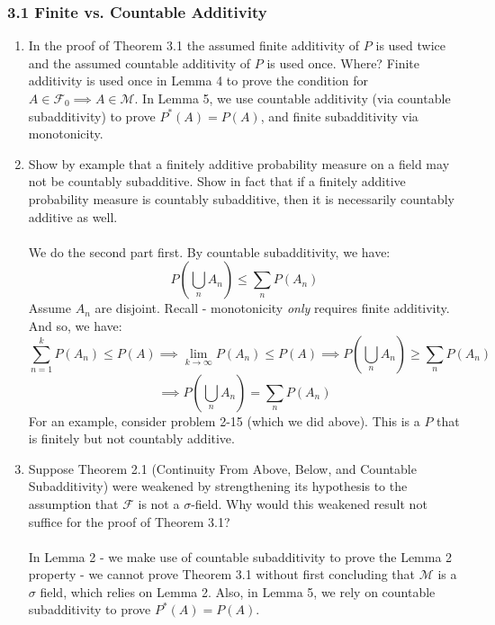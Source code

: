 \documentclass[12pt,a4paper]{article}
\newcommand{\1}[1]{\mathbbm{1}\left\{ #1 \right\}}
\newcommand{\fcal}{\mathcal{F}}
\newcommand{\mcal}{\mathcal{M}}
\begin{document}
\subsubsection{3.1 Finite vs. Countable Additivity}
\begin{enumerate}
	\item In the proof of Theorem 3.1 the assumed finite additivity of $P$ is used twice and the assumed countable additivity of $P$ is used once. Where? Finite additivity is used once in Lemma 4 to prove the condition for $A \in \fcal_0 \implies A \in \mcal$. In Lemma 5, we use countable additivity (via countable subadditivity) to prove $P^*(A) = P(A)$, and finite subadditivity via monotonicity.
	
	\item Show by example that a finitely additive probability measure on a field may not be countably subadditive. Show in fact that if a finitely additive probability measure is countably subadditive, then it is necessarily countably additive as well.
	\\\\
	We do the second part first. By countable subadditivity, we have:
	$$
		P\left(\bigcup_n A_n\right) \leq \sum_n P(A_n)
	$$
	Assume $A_n$ are disjoint. Recall - monotonicity \textit{only} requires finite additivity. And so, we have:
	$$
		\sum_{n=1}^k P(A_n) \leq P(A) \implies
		\lim_{k \to \infty} P(A_n) \leq P(A) \implies
		P\left(\bigcup_n A_n\right) \geq \sum_n P(A_n)
	$$
	$$
		\implies
		P\left(\bigcup_n A_n\right) = \sum_n P(A_n)
	$$
	For an example, consider problem 2-15 (which we did above). This is a $P$ that is finitely but not countably additive.
	
	\item Suppose Theorem 2.1 (Continuity From Above, Below, and Countable Subadditivity) were weakened by strengthening its hypothesis to the assumption that $\fcal$ is not a $\sigma$-field. Why would this weakened result not suffice for the proof of Theorem 3.1?
	\\\\
	In Lemma 2 - we make use of countable subadditivity to prove the Lemma 2 property - we cannot prove Theorem 3.1 without first concluding that $\mcal$ is a $\sigma$ field, which relies on Lemma 2. Also, in Lemma 5, we rely on countable subadditivity to prove $P^*(A) = P(A)$. 
\end{enumerate}
\end{document}

